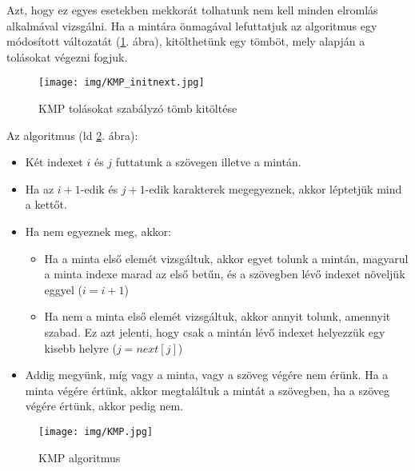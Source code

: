 \documentclass[margin=0px]{article}
\begin{document}
Azt, hogy ez egyes esetekben mekkorát tolhatunk nem kell minden elromlás alkalmával vizsgálni. Ha a mintára önmagával lefuttatjuk az algoritmus egy módosított változatát (\ref{fig:KMP_initnext}. ábra), kitölthetünk egy tömböt, mely alapján a tolásokat végezni fogjuk.

\begin{figure}[H]
    \centering
    \texttt{[image: img/KMP\_initnext.jpg]}
    \caption{KMP tolásokat szabályzó tömb kitöltése}
    \label{fig:KMP_initnext}
\end{figure}

Az algoritmus (ld \ref{fig:KMP}. ábra):
\begin{itemize}
    \item Két indexet $i$ és $j$ futtatunk a szövegen illetve a mintán.
    \item Ha az $i+1$-edik és $j+1$-edik karakterek megegyeznek, akkor léptetjük mind a kettőt.
    \item Ha nem egyeznek meg, akkor:
          \begin{itemize}
              \item Ha a minta első elemét vizsgáltuk, akkor egyet tolunk a mintán, magyarul a minta indexe marad az első betűn, és a szövegben lévő indexet növeljük eggyel ($i=i+1$)
              \item Ha nem a minta első elemét vizsgáltuk, akkor annyit tolunk, amennyit szabad. Ez azt jelenti, hogy csak a mintán lévő indexet helyezzük egy kisebb helyre ($j = next[j]$)
          \end{itemize}
    \item Addig megyünk, míg vagy a minta, vagy a szöveg végére nem érünk. Ha a minta végére értünk, akkor megtaláltuk a mintát a szövegben, ha a szöveg végére értünk, akkor pedig nem.
\end{itemize}

\begin{figure}[H]
    \centering
    \texttt{[image: img/KMP.jpg]}
    \caption{KMP algoritmus}
    \label{fig:KMP}
\end{figure}
\end{document}
